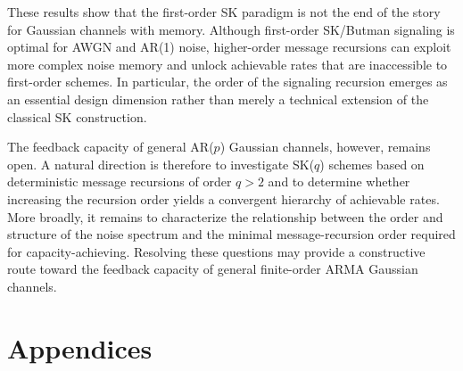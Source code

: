 \documentclass[12pt]{article}
\begin{document}
These results show that the first-order SK paradigm is not the end of the story for Gaussian channels with memory. Although first-order SK/Butman signaling is optimal for AWGN and AR(1) noise, higher-order message recursions can exploit more complex noise memory and unlock achievable rates that are inaccessible to first-order schemes. In particular, the order of the signaling recursion emerges as an essential design dimension rather than merely a technical extension of the classical SK construction.

The feedback capacity of general AR($p$) Gaussian channels, however, remains open. A natural direction is therefore to investigate SK($q$) schemes based on deterministic message recursions of order $q>2$ and to determine whether increasing the recursion order yields a convergent hierarchy of achievable rates. More broadly, it remains to characterize the relationship between the order and structure of the noise spectrum and the minimal message-recursion order required for capacity-achieving. Resolving these questions may provide a constructive route toward the feedback capacity of general finite-order ARMA Gaussian channels.


\section*{Appendices}
\appendix
\end{document}
